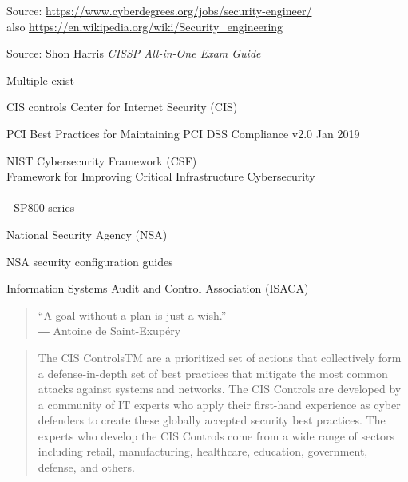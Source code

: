 \documentclass[Screen16to9,17pt]{foils}
\begin{document}
Source: \url{https://www.cyberdegrees.org/jobs/security-engineer/}\\
also
\url{https://en.wikipedia.org/wiki/Security_engineering}






Source: Shon Harris \emph{CISSP All-in-One Exam Guide}




\begin{list1}
\item Multiple exist
\vskip 1cm
\begin{list2}
\item CIS controls Center for Internet Security (CIS) 
\item PCI Best Practices for Maintaining PCI DSS Compliance v2.0 Jan 2019
\item NIST Cybersecurity Framework (CSF)\\
Framework for Improving
Critical Infrastructure Cybersecurity\\ \\
 - SP800 series
\item National Security Agency (NSA)\\
\item NSA security configuration guides\\
\item Information Systems Audit and Control Association (ISACA)\\
\end{list2}
\end{list1}


\begin{quote}
  “A goal without a plan is just a wish.”\\
  ― Antoine de Saint-Exupéry
\end{quote}

\begin{quote}
  The CIS ControlsTM are a prioritized set of actions that collectively form a defense-in-depth set
of best practices that mitigate the most common attacks against systems and networks. The
CIS Controls are developed by a community of IT experts who apply their first-hand experience
as cyber defenders to create these globally accepted security best practices. The experts who
develop the CIS Controls come from a wide range of sectors including retail, manufacturing,
healthcare, education, government, defense, and others.
\end{quote}
\end{document}
